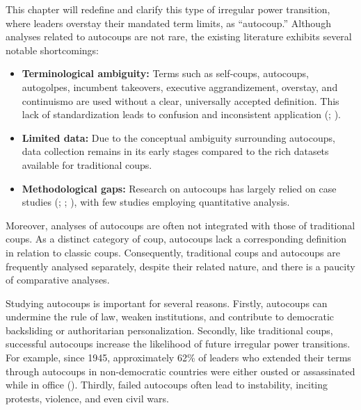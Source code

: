 \documentclass[
  12pt,
]{report}
\begin{document}
This chapter will redefine and clarify this type of irregular power
transition, where leaders overstay their mandated term limits, as
``autocoup.'' Although analyses related to autocoups are not rare, the
existing literature exhibits several notable shortcomings:

\begin{itemize}
\item
  \textbf{Terminological ambiguity:} Terms such as self-coups,
  autocoups, autogolpes, incumbent takeovers, executive aggrandizement,
  overstay, and continuismo are used without a clear, universally
  accepted definition. This lack of standardization leads to confusion
  and inconsistent application
  (;
  ).
\item
  \textbf{Limited data:} Due to the conceptual ambiguity surrounding
  autocoups, data collection remains in its early stages compared to the
  rich datasets available for traditional coups.
\item
  \textbf{Methodological gaps:} Research on autocoups has largely relied
  on case studies (;
  ;
  ), with few studies employing quantitative analysis.
\end{itemize}

Moreover, analyses of autocoups are often not integrated with those of
traditional coups. As a distinct category of coup, autocoups lack a
corresponding definition in relation to classic coups. Consequently,
traditional coups and autocoups are frequently analysed separately,
despite their related nature, and there is a paucity of comparative
analyses.

Studying autocoups is important for several reasons. Firstly, autocoups
can undermine the rule of law, weaken institutions, and contribute to
democratic backsliding or authoritarian personalization. Secondly, like
traditional coups, successful autocoups increase the likelihood of
future irregular power transitions. For example, since 1945,
approximately 62\% of leaders who extended their terms through autocoups
in non-democratic countries were either ousted or assassinated while in
office (). Thirdly, failed
autocoups often lead to instability, inciting protests, violence, and
even civil wars.
\end{document}
